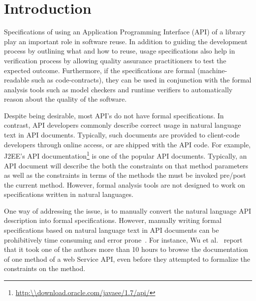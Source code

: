 \section{Introduction}
\label{sec:introduction}









Specifications of using an Application Programming Interface (API) of a library play an important role in software reuse.
In addition to guiding the development process by outlining what and how to reuse, 
usage specifications also help in verification process by allowing quality assurance practitioners to test the expected outcome.
Furthermore, if the specifications are formal (machine-readable such as code-contracts),
they can be used in conjunction with the formal analysis tools such as model checkers and runtime verifiers
to automatically reason about the quality of the software.


Despite being desirable, most API's do not have formal specifications.
In contrast, API developers commonly describe correct usage in natural language text in API documents.
Typically, such documents are provided to client-code developers through online access, or are shipped with the API code.
For example, J2EE's API documentation\footnote{\url{http:\\download.oracle.com/javaee/1.7/api/}} is one of the popular API documents.
Typically, an API document will describe the both the constraints on that method parameters as well as the constraints in terms of the methods the must be invoked pre/post the current method.
However, formal analysis tools are not designed to work on specifications written in natural languages.

One way of addressing the issue, is to manually convert the natural language API description into formal specifications. 
However, manually writing formal specifications based on natural language text in API documents can be prohibitively time consuming and error prone~\cite{wu2013inferring,RubingerWEB10}. 
For instance, Wu et al.~\cite{wu2013inferring} report that it took one of the authors more than 10 hours to browse the documentation of one method of a web Service API, even before they attempted to formalize the constraints on the method.

